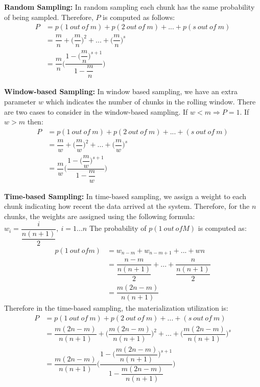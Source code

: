 \textbf{Random Sampling:} 
In random sampling each chunk has the same probability of being sampled.
Therefore, $P$ is computed as follows:
\begin{align}
P &= p(1\ out\ of\ m) + p(2\ out\ of\ m) + ... + p(s\ out\ of\ m) \\
&= \dfrac{m}{n} + \biggl(\dfrac{m}{n}\biggr) ^2 + ... + \biggl(\dfrac{m}{n}\biggr) ^s \\
& = \dfrac{m}{n}\Biggl(\dfrac{1-\biggl(\dfrac{m}{n}\biggr) ^{s+1}}{1 - \dfrac{m}{n }}\Biggr)
\end{align}

\textbf{Window-based Sampling:}
In window based sampling, we have an extra parameter $w$ which indicates the number of chunks in the rolling window.
There are two cases to consider in the window-based sampling.\newline
If $w < m \Rightarrow P = 1$.
If $w > m$ then: 	
\begin{align}
P &= p(1\ out\ of\ m) + p(2\ out\ of\ m) + ... + (s\ out\ of\ m) \\
&= \dfrac{m}{w} + \biggl(\dfrac{m}{w}\biggr) ^2 + ... + \biggl(\dfrac{m}{w}\biggr) ^s \\
& = \dfrac{m}{w}\Biggl(\dfrac{1-\biggl(\dfrac{m}{w}\biggr) ^{s+1}}{1 - \dfrac{m}{w}}\Biggr)
\end{align}

\textbf{Time-based Sampling:}
In time-based sampling, we assign a weight to each chunk indicating how recent the data arrived at the system.
Therefore, for the $n$ chunks, the weights are assigned using the following formula:
$w_i = \dfrac{i}{\dfrac{n(n+1)}{2}}, \ i = 1 ... n$
The probability of $p(1\ out\ of M )$ is computed as:
\begin{align}
p(1\ out\ of m ) &= w_{n-m} + w_{n-m+1}+ ... + w{n}\\
&=\dfrac{n-m}{\dfrac{n(n+1)}{2}} + ... + \dfrac{n}{\dfrac{n(n+1)}{2}} \\
&= \dfrac{m(2n-m)}{n(n+1)}
\end{align}
Therefore in the time-based sampling, the materialization utilization is:
\begin{align}
P &= p(1\ out\ of\ m) + p(2\ out\ of\ m) + ... + (s\ out\ of\ m) \\
&= \dfrac{m(2n-m)}{n(n+1)} + \biggl(\dfrac{m(2n-m)}{n(n+1)}\biggr) ^2 + ... + \biggl(\dfrac{m(2n-m)}{n(n+1)}\biggr) ^s \\
& = \dfrac{m(2n-m)}{n(n+1)}\Biggl(\dfrac{1-\biggl(\dfrac{m(2n-m)}{n(n+1)}\biggr) ^{s+1}}{1 - \dfrac{m(2n-m)}{n(n+1)}}\Biggr)
\end{align}



